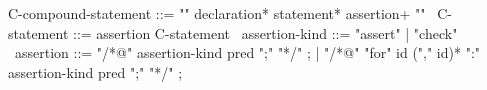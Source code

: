 \begin{syntax}
  C-compound-statement ::= "{" declaration* statement* assertion+ "}"
        \
  C-statement ::= assertion C-statement \
  assertion-kind ::= "assert" | "check" \
  assertion ::= "/*@" assertion-kind pred ";" "*/" ;
  | "/*@" "for" id ("," id)* ":" assertion-kind pred ";" "*/" ;
\end{syntax}
